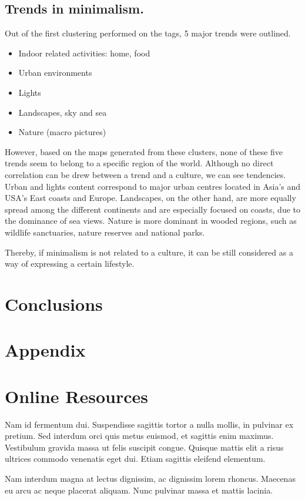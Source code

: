 \documentclass[sigconf]{acmart}
\begin{document}
\subsection*{Trends in minimalism.}
Out of the first clustering performed on the tags, 5 major trends were outlined.
	\begin{itemize}
		\item Indoor related activities: home, food
		\item Urban environments
		\item Lights
		\item Landscapes, sky and sea
		\item Nature (macro pictures)
	\end{itemize}
However, based on the maps generated from these clusters, none of these five trends seem to belong to a specific region of the world. Although no direct correlation can be drew between a trend and a culture, we can see tendencies. Urban and lights content correspond to major urban centres located in Asia's and USA's East coasts and Europe. Landscapes, on the other hand, are more equally spread among the different continents and are especially focused on coasts, due to the dominance of sea views. Nature is more dominant in wooded regions, such as wildlife sanctuaries, nature reserves and national parks. 

Thereby, if minimalism is not related to a culture, it can be still considered as a way of expressing a certain lifestyle.

\section{Conclusions}

\section{Appendix}




\appendix


\section{Online Resources}

Nam id fermentum dui. Suspendisse sagittis tortor a nulla mollis, in
pulvinar ex pretium. Sed interdum orci quis metus euismod, et sagittis
enim maximus. Vestibulum gravida massa ut felis suscipit
congue. Quisque mattis elit a risus ultrices commodo venenatis eget
dui. Etiam sagittis eleifend elementum.

Nam interdum magna at lectus dignissim, ac dignissim lorem
rhoncus. Maecenas eu arcu ac neque placerat aliquam. Nunc pulvinar
massa et mattis lacinia.
\end{document}
